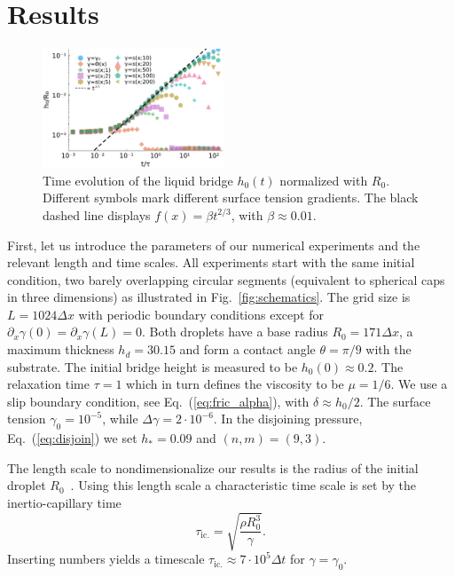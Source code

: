 \documentclass[twocolumn,amsmath,amssymb,showpacs,pre,nofootinbib,superscriptaddress]{revtex4-1} %
\begin{document}
\section{Results}\label{sec:results}
\begin{figure}
    \centering
    \includegraphics[width=0.48\textwidth]{Figures/bridge_evo_all_2.pdf}
    \caption{Time evolution of the liquid bridge $h_0(t)$ normalized with $R_0$. 
    Different symbols mark different surface tension gradients.
    The black dashed line displays $f(x) = \beta t^{2/3}$, with $\beta \approx 0.01$.}
    \label{fig:bridge_growth}
\end{figure}
First, let us introduce the parameters of our numerical experiments and the relevant length and time scales.
All experiments start with the same initial condition, two barely overlapping circular segments (equivalent to spherical caps in three dimensions) as illustrated in Fig.~\ref{fig:schematics}.
The grid size is $L=1024\Delta x$ with periodic boundary conditions except for $\partial_x\gamma(0) = \partial_x\gamma(L) = 0$.
Both droplets have a base radius $R_0 = 171\Delta x$, a maximum thickness $h_d = 30.15$ and form a contact angle $\theta = \pi/9$ with the substrate.
The initial bridge height is measured to be $h_0(0) \approx 0.2$.
The relaxation time $\tau = 1$ which in turn defines the viscosity to be $\mu = 1/6$. 
We use a slip boundary condition, see Eq.~(\ref{eq:fric_alpha}), with $\delta \approx h_0/2$.
The surface tension $\gamma_0 = 10^{-5}$, while $\Delta\gamma = 2\cdot 10^{-6}$.
In the disjoining pressure, Eq.~(\ref{eq:disjoin}) we set $h_{\ast} = 0.09$ and $(n,m) = (9,3)$.

The length scale to nondimensionalize our results is the radius of the initial droplet $R_0$~\cite{PhysRevLett.111.144502, PhysRevLett.95.164503}.
Using this length scale a characteristic time scale is set by the inertio-capillary time 
\begin{equation}\label{eq:inertio-cap-time}
    \tau_{\text{ic.}} = \sqrt{\frac{\rho R_0^3}{\gamma}}.
\end{equation}
Inserting numbers yields a timescale $\tau_{\text{ic.}} \approx 7\cdot 10^5 \Delta t$ for $\gamma=\gamma_0$. 
\end{document}
